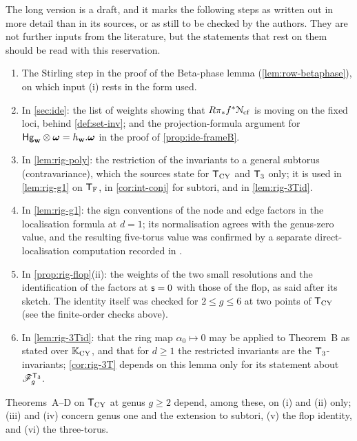 The long version is a draft, and it marks the following steps as written out in more detail than in its sources, or as still to be checked by the authors. They are not further inputs from the literature, but the statements that rest on them should be read with this reservation.
\begin{enumerate}
\item The Stirling step in the proof of the Beta-phase lemma (\cref{lem:row-betaphase}), on which input (i) rests in the form used.
\item In \cref{sec:ide}: the list of weights showing that $R\pi_*f^*\mathcal{N}_{\mathrm{cf}}$ is moving on the fixed loci, behind \cref{def:set-inv}; and the projection-formula argument for $\mathsf{Hg}_{\mathbf{w}}\otimes\boldsymbol{\omega}=h_{\mathbf{w}}.\boldsymbol{\omega}$ in the proof of \cref{prop:ide-frameB}.
\item In \cref{lem:rig-poly}: the restriction of the invariants to a general subtorus (contravariance), which the sources state for $\mathsf{T}_{\mathrm{CY}}$ and $\mathsf{T}_{3}$ only; it is used in \cref{lem:rig-g1} on $\mathsf{T}_{\mathrm{F}}$, in \cref{cor:int-conj} for subtori, and in \cref{lem:rig-3Tid}.
\item In \cref{lem:rig-g1}: the sign conventions of the node and edge factors in the localisation formula at $d=1$; its normalisation agrees with the genus-zero value, and the resulting five-torus value was confirmed by a separate direct-localisation computation recorded in .
\item In \cref{prop:rig-flop}(ii): the weights of the two small resolutions and the identification of the factors at $\mathsf{s}=0$ with those of the flop, as said after its sketch. The identity itself was checked for $2\leq g\leq6$ at two points of $\mathsf{T}_{\mathrm{CY}}$ (see the finite-order checks above).
\item In \cref{lem:rig-3Tid}: that the ring map $\alpha_0\mapsto0$ may be applied to Theorem~B as stated over $\mathbb{K}_{\mathrm{CY}}$, and that for $d\geq1$ the restricted invariants are the $\mathsf{T}_{3}$-invariants; \cref{cor:rig-3T} depends on this lemma only for its statement about $\mathscr{F}^{\mathsf{T}_{3}}_g$.
\end{enumerate}
Theorems~A--D on $\mathsf{T}_{\mathrm{CY}}$ at genus $g\geq2$ depend, among these, on (i) and (ii) only; (iii) and (iv) concern genus one and the extension to subtori, (v) the flop identity, and (vi) the three-torus.
